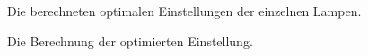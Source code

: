 \documentclass[a4paper,bibtotoc,oneside]{scrbook}
\begin{document}
\begin{figure} [htbp]
\caption{Die berechneten optimalen Einstellungen der einzelnen Lampen.}
\label{optb}
\end{figure} 

\begin{figure} [htbp]
\caption{Die Berechnung der optimierten Einstellung.}
\label{optb}
\end{figure} 
\end{document}
